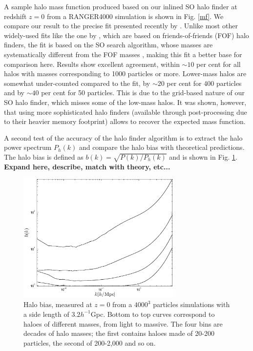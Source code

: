 A sample halo mass function produced based on our inlined SO halo finder 
at redshift $z=0$ from a RANGER4000 simulation is shown in Fig. \ref{mf}. We compare our result to the 
precise fit presented recently by \citet{2008ApJ...688..709T}. Unlike most
other widely-used fits like the one by \citet{2002MNRAS.329...61S}, which are based on friends-of-friends (FOF)
halo finders, the \citet{2008ApJ...688..709T} fit is based on the
SO search algorithm, whose masses are systematically different 
from the FOF masses \citep[e.g.][]{2007MNRAS.374....2R,2008ApJ...688..709T}, 
making this fit a better base for comparison here. Results show excellent
agreement, within $\sim10$ per cent for all halos with masses corresponding to
1000 particles or more. Lower-mass halos are somewhat under-counted compared
to the \citet{2008ApJ...688..709T} fit, by $\sim20$ per cent for 400 particles and 
by $\sim40$ per cent for 50 particles. This is due to the grid-based nature of our
SO halo finder, which misses some of the low-mass halos. It was shown, however, that using more sophisticated
halo finders (available through post-processing due to their heavier memory
footprint) allows to recover the expected mass function.

A second test of the accuracy of the halo finder algorithm is to extract the halo power spectrum $P_{h}(k)$ and compare the halo bias
with theoretical predictions. The halo bias is defined as $b(k) = \sqrt{P(k)/P_{h}(k)}$ and is shown in Fig. \ref{fig:halo}.
{\bf Expand here, describe, match with theory, etc...}
\begin{figure}%
  \begin{center}
    \includegraphics[width=3.2in]{graphs/bias.eps}
  \end{center}
  \caption{Halo bias, measured at $z=0$ from a $4000^3$ particles simulations with a side length of $3.2 h^{-1}$Gpc.
  Bottom to top curves correspond to haloes of different masses, from light to massive. The four bins are decades
  of halo masses; the first contains haloes made of 20-200 particles, the second of 200-2,000 and so on.
    \label{fig:halo}}
\end{figure}


